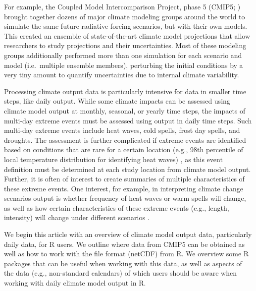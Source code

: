 For example, the Coupled Model Intercomparison Project, phase 5 (CMIP5;
\citet{taylor2012overview}) brought together dozens of major climate
modeling groups around the world to simulate the same future radiative
forcing scenarios, but with their own models. This created an ensemble
of state-of-the-art climate model projections that allow researchers to
study projections and their uncertainties. Most of these modeling groups
additionally performed more than one simulation for each scenario and
model (i.e.~multiple ensemble members), perturbing the initial
conditions by a very tiny amount to quantify uncertainties due to
internal climate variability.

Processing climate output data is particularly intensive for data in
smaller time steps, like daily output. While some climate impacts can be
assessed using climate model output at monthly, seasonal, or yearly time
steps, the impacts of multi-day extreme events must be assessed using
output in daily time steps. Such multi-day extreme events include heat
waves, cold spells, frost day spells, and droughts. The assessment is
further complicated if extreme events are identified based on conditions
that are rare for a certain location (e.g., 98th percentile of local
temperature distribution for identifying heat waves) \citep{IPCCch1}, as
this event definition must be determined at each study location from
climate model output. Further, it is often of interest to create
summaries of multiple characteristics of these extreme events. One
interest, for example, in interpreting climate change scenarios output
is whether frequency of heat waves or warm spells will change, as well
as how certain characteristics of these extreme events (e.g., length,
intensity) will change under different scenarios \citep{IPCCch1}.

We begin this article with an overview of climate model output data,
particularly daily data, for R users. We outline where data from CMIP5
can be obtained as well as how to work with the file format (netCDF)
from R. We overview some R packages that can be useful when working with
this data, as well as aspects of the data (e.g., non-standard calendars)
of which users should be aware when working with daily climate model
output in R.

